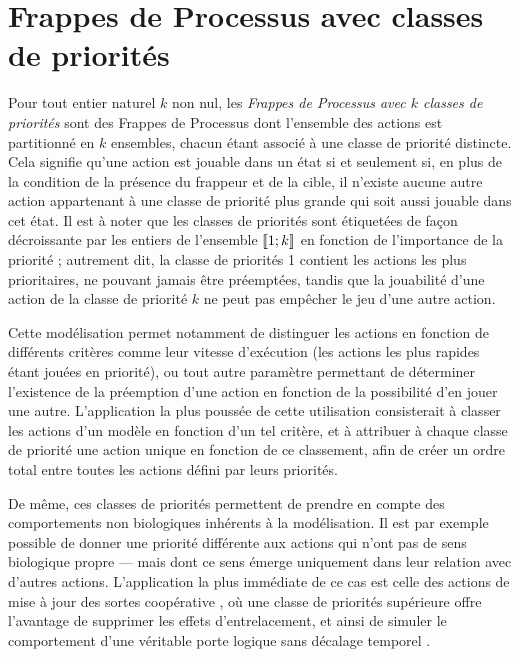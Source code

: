 \section{Frappes de Processus avec classes de priorités}


Pour tout entier naturel $k$ non nul,
les \emph{Frappes de Processus avec $k$ classes de priorités}
sont des Frappes de Processus dont l'ensemble des actions est partitionné
en $k$ ensembles, chacun étant associé à une classe de priorité distincte.
Cela signifie qu'une action est jouable dans un état si et seulement si,
en plus de la condition de la présence du frappeur et de la cible,
il n'existe aucune autre action appartenant à une classe de priorité plus grande
qui soit aussi jouable dans cet état.
Il est à noter que les classes de priorités sont étiquetées de façon décroissante par les entiers de
l'ensemble $\llbracket 1; k \rrbracket$ en fonction de l'importance de la priorité ;
autrement dit, la classe de priorités 1 contient les actions les plus prioritaires,
ne pouvant jamais être préemptées,
tandis que la jouabilité d'une action de la classe de priorité $k$ ne peut pas empêcher le jeu
d'une autre action.

Cette modélisation permet notamment de distinguer les actions en fonction 
de différents critères comme
leur vitesse d'exécution (les actions les plus rapides étant jouées en priorité),
ou tout autre paramètre permettant de déterminer l'existence de la préemption d'une action
en fonction de la possibilité d'en jouer une autre.
L'application la plus poussée de cette utilisation consisterait à
classer les actions d'un modèle en fonction d'un tel critère,
et à attribuer à chaque classe de priorité une action unique en fonction de ce classement,
afin de créer un ordre total entre toutes les actions défini par leurs priorités.

De même, ces classes de priorités permettent de prendre en compte des comportements non biologiques
inhérents à la modélisation.
Il est par exemple possible de donner une priorité différente aux
actions qui n'ont pas de sens biologique propre
--- mais dont ce sens émerge uniquement dans leur relation avec d'autres actions.
L'application la plus immédiate de ce cas est celle des actions de mise à jour
des sortes coopérative ,
où une classe de priorités supérieure offre l'avantage de supprimer les effets d'entrelacement,
et ainsi de simuler le comportement d'une véritable porte logique sans décalage temporel .

